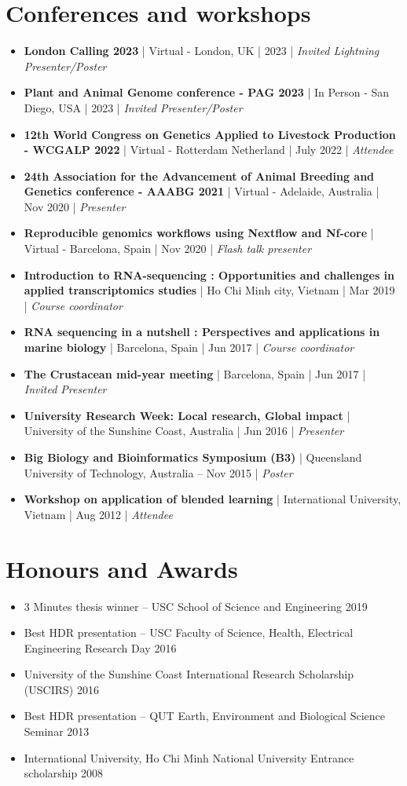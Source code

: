 \documentclass[letterpaper,11pt]{article}
\newcommand{\resumeBlack}[1]{\item\small{{#1}}}
\newcommand{\resumeItemListStart}{\begin{itemize}}
\newcommand{\resumeItemListEnd}{\end{itemize}}
\begin{document}
\section{Conferences and workshops}
  \resumeItemListStart
    \resumeBlack{\textbf{London Calling 2023}  | Virtual - London, UK | 2023 | \textit{Invited Lightning Presenter/Poster}}
    \resumeBlack{\textbf{Plant and Animal Genome conference - PAG 2023}  | In Person - San Diego, USA | 2023 | \textit{Invited Presenter/Poster}}
    \resumeBlack{\textbf{12th World Congress on Genetics Applied to Livestock Production - WCGALP 2022}  | Virtual - Rotterdam Netherland | July 2022 | \textit{Attendee}}
    \resumeBlack{\textbf{24th Association for the Advancement of Animal Breeding and Genetics conference - AAABG 2021}  | Virtual - Adelaide, Australia | Nov 2020 | \textit{Presenter}}
    \resumeBlack{\textbf{Reproducible genomics workflows using Nextflow and Nf-core}  | Virtual - Barcelona, Spain | Nov 2020 | \textit{Flash talk presenter}}
    \resumeBlack{\textbf{Introduction to RNA-sequencing : Opportunities and challenges in applied transcriptomics studies}  |  Ho Chi Minh city, Vietnam | Mar 2019 | \textit{Course coordinator}}
    \resumeBlack{\textbf{RNA sequencing in a nutshell : Perspectives and applications in marine biology}  |  Barcelona, Spain | Jun 2017 | \textit{Course coordinator}}
    \resumeBlack{\textbf{The Crustacean mid-year meeting} | Barcelona, Spain | Jun 2017 | \textit{Invited Presenter}}
    \resumeBlack{\textbf{University Research Week: Local research, Global impact} | University of the Sunshine Coast, Australia | Jun 2016 | \textit{Presenter}}
    \resumeBlack{\textbf{Big Biology and Bioinformatics Symposium (B3)} | Queensland University of Technology, Australia – Nov 2015 | \textit{Poster}}
    \resumeBlack{\textbf{Workshop on application of blended learning} | International University, Vietnam | Aug 2012 | \textit{Attendee}}
  \resumeItemListEnd

\section{Honours and Awards}
\resumeItemListStart
	\resumeBlack{3 Minutes thesis winner – USC School of Science and Engineering 2019}
	\resumeBlack{Best HDR presentation – USC Faculty of Science, Health, Electrical Engineering Research Day 2016}
  	\resumeBlack{University of the Sunshine Coast International Research Scholarship (USCIRS) 2016}
  	\resumeBlack{Best HDR presentation –  QUT Earth, Environment and Biological Science Seminar 2013}
  	\resumeBlack{International University, Ho Chi Minh National University Entrance scholarship 2008}
\resumeItemListEnd  
\end{document}
